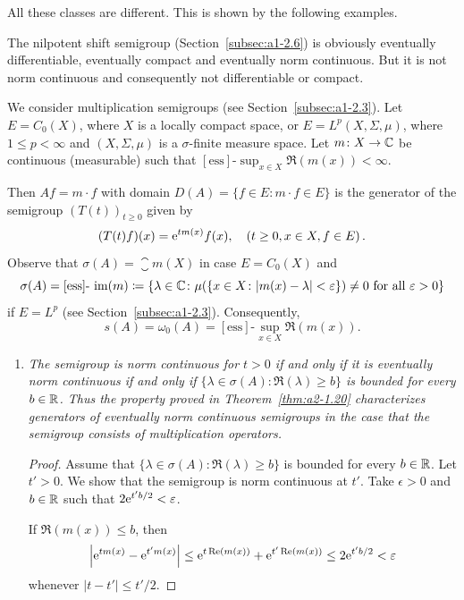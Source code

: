 All these classes are different.
This is shown by the following examples.
\begin{example}\label{ex:a2-1.27}
The nilpotent shift semigroup (Section~\ref{subsec:a1-2.6}) is obviously eventually differentiable, eventually compact and eventually norm continuous.
But it is not norm continuous and consequently not differentiable or compact.
\end{example}
\begin{example}\label{ex:a2-1.28}
We consider multiplication semigroups (see Section~\ref{subsec:a1-2.3}).
Let $E = C_{0}(X)$, where $X$ is a locally compact space, or $E = L^{p}(X,\Sigma,\mu)$, where $1 \leq p < \infty$ and $(X,\Sigma,\mu)$ is a $\sigma$-finite measure space.
Let $m \colon X \to \mathbb{C}$ be continuous (\resp measurable) such that $[\text{ess}]\text{-}\sup_{x \in X} \Re(m(x)) < \infty$.

Then $Af = m \cdot f$ with domain $D(A) = \{f \in E \colon m \cdot f \in E\}$ is the generator of the semigroup $(T(t))_{t \geq 0}$ given by
\[
    (T(t)f)(x) = \eu^{tm(x)}f(x), \quad (t \geq 0, x \in X, f \in E )\, .
\]
Observe that $\sigma(A) = \closure{m(X)}$ in case $E = C_{0}(X)$ and 
\[
\sigma(A) = [\text{ess}]\text{-}\Image{m} \coloneq \{\lambda \in \C \colon \mu(\{x \in X \colon |m(x)-\lambda| < \epsilon\}) \neq 0 \text{ for all } \epsilon > 0\} 
\]
if\/ $E = L^{p}$ (see Section~\ref{subsec:a1-2.3}).
Consequently, 
%
\[
	s(A) = \omega_{0}(A) = [\text{ess}]\text{-}\sup_{x \in X} \Re(m(x)).
\]
%
\begin{enumerate}[\upshape (i), wide, labelindent=.25em]
\item \label{ex:a2-1.28-1}
\textit{The semigroup is norm continuous for $t > 0$ if and only if it is eventually norm continuous if and only if 
$\{\lambda \in \sigma(A) \colon \Re(\lambda) \geq b\}$ 
is bounded for every $b \in \mathbb{R}$.
Thus the property proved in Theorem~\ref{thm:a2-1.20}   characterizes generators of eventually norm continuous semigroups in the case that the semigroup consists of multiplication operators.}
\begin{proof}
Assume that $\{\lambda \in \sigma(A) \colon \Re(\lambda) \geq b\}$ is bounded for every $b \in \mathbb{R}$.
Let $t' > 0$.
We show that the semigroup is norm continuous at $t'$.
Take $\epsilon > 0$ and $b \in \mathbb{R}$ such that $2\eu^{t'b/2} < \epsilon$.

If\/ $\Re(m(x)) \leq b$, then
\[
    \left|\eu^{tm(x)} - \eu^{t'm(x)}\right| \leq \eu^{t\Re(m(x))} + \eu^{t'\Re(m(x))} \leq 2\eu^{t'b/2} < \epsilon
\]
whenever $|t-t'| \leq t'/2$.


\end{proof}
\end{enumerate}
\end{example}
